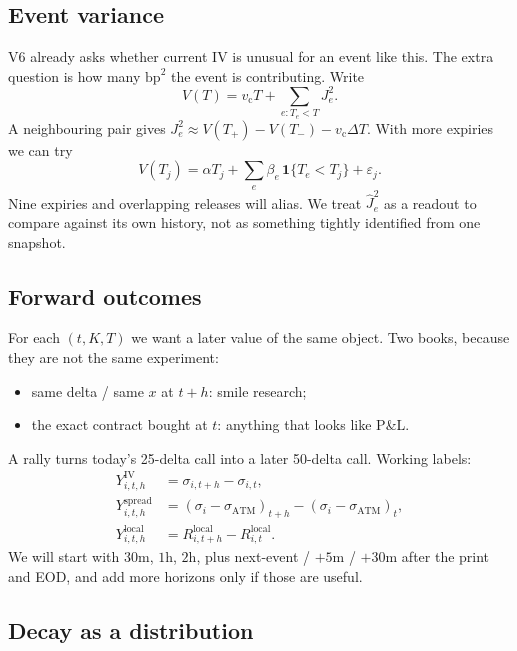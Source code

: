 \documentclass[11pt]{article}
\newcommand{\eps}{\varepsilon}
\begin{document}
\subsection{Event variance}

V6 already asks whether current IV is unusual for an event like
this.  The extra question is how many \(\mathrm{bp}^2\) the event is
contributing.  Write
\[
V(T)
=
v_{\mathrm{c}}T
+
\sum_{e:T_e<T}J_e^2.
\]
A neighbouring pair gives
\(J_e^2\approx V(T_+)-V(T_-)-v_{\mathrm{c}}\Delta T\).
With more expiries we can try
\[
V(T_j)
=
\alpha T_j
+
\sum_e \beta_e\,\mathbf{1}\{T_e<T_j\}
+\eps_j.
\]
Nine expiries and overlapping releases will alias.  We treat
\(\hat J_e^2\) as a readout to compare against its own history, not
as something tightly identified from one snapshot.

\subsection{Forward outcomes}

For each \((t,K,T)\) we want a later value of the same object.  Two
books, because they are not the same experiment:

\begin{itemize}
    \item same delta / same \(x\) at \(t+h\): smile research;
    \item the exact contract bought at \(t\): anything that looks
    like P\&L.
\end{itemize}

A rally turns today's 25-delta call into a later 50-delta call.
Working labels:
\begin{align}
Y^{\mathrm{IV}}_{i,t,h}
&=
\sigma_{i,t+h}-\sigma_{i,t},\\
Y^{\mathrm{spread}}_{i,t,h}
&=
(\sigma_i-\sigma_{\mathrm{ATM}})_{t+h}
-
(\sigma_i-\sigma_{\mathrm{ATM}})_t,\\
Y^{\mathrm{local}}_{i,t,h}
&=
R^{\mathrm{local}}_{i,t+h}-R^{\mathrm{local}}_{i,t}.
\end{align}
We will start with \(30\mathrm{m}\), \(1\mathrm{h}\), \(2\mathrm{h}\),
plus next-event / \(+5\mathrm{m}\) / \(+30\mathrm{m}\) after the
print and EOD, and add more horizons only if those are useful.

\subsection{Decay as a distribution}
\end{document}
